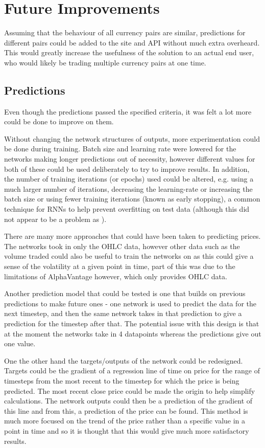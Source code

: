     \section{Future Improvements}
    
    Assuming that the behaviour of all currency pairs are similar, predictions for different pairs could be added to the site and API without much extra overheard. This would greatly increase the usefulness of the solution to an actual end user, who would likely be trading multiple currency pairs at one time.

        \subsection{Predictions}
        Even though the predictions passed the specified criteria, it was felt a lot more could be done to improve on them.

        Without changing the network structures of outputs, more experimentation could be done during training. Batch size and learning rate were lowered for the networks making longer predictions out of necessity, however different values for both of these could be used deliberately to try to improve results. In addition, the number of training iterations (or epochs) used could be altered, e.g. using a much larger number of iterations, decreasing the learning-rate or increasing the batch size or using fewer training iterations (known as early stopping), a common technique for RNNs to help prevent overfitting on test data (although this did not appear to be a problem as ).
        
        There are many more approaches that could have been taken to predicting prices. The networks took in only the OHLC data, however other data such as the volume traded could also be useful to train the networks on as this could give a sense of the volatility at a given point in time, part of this was due to the limitations of AlphaVantage however, which only provides OHLC data.

        Another prediction model that could be tested is one that builds on previous predictions to make future ones - one network is used to predict the data for the next timestep, and then the same network takes in that prediction to give a prediction for the timestep after that. The potential issue with this design is that at the moment the networks take in 4 datapoints whereas the predictions give out one value.

        One the other hand the targets/outputs of the network could be redesigned. Targets could be the gradient of a regression line of time on price for the range of timesteps from the most recent to the timestep for which the price is being predicted. The most recent close price could be made the origin to help simplify calculations. The network outputs could then be a prediction of the gradient of this line and from this, a prediction of the price can be found. This method is much more focused on the trend of the price rather than a specific value in a point in time and so it is thought that this would give much more satisfactory results.

